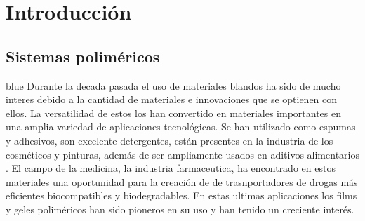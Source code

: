 
\chapter{Introducci\'on}
\label{Chapter1} %


\section{Sistemas polim\'ericos}


\begin{color}{blue}
Durante la decada pasada el uso de materiales blandos ha sido de mucho interes debido a la cantidad de materiales e innovaciones que se optienen con ellos.
La versatilidad de estos los han convertido en materiales  importantes en una amplia variedad de aplicaciones tecnológicas.
Se han utilizado como  espumas y adhesivos, son excelente detergentes, est\'an presentes en la industria de los  cosméticos y pinturas, adem\'as de ser ampliamente usados en aditivos alimentarios . El campo de la medicina, la industria farmaceutica, ha encontrado en estos materiales una oportunidad para la creaci\'on de de trasnportadores de drogas m\'as eficientes biocompatibles y biodegradables.
En estas ultimas aplicaciones los  films y geles  polim\'ericos han sido pioneros en su uso y han tenido un creciente inter\'es.
\end{color}

